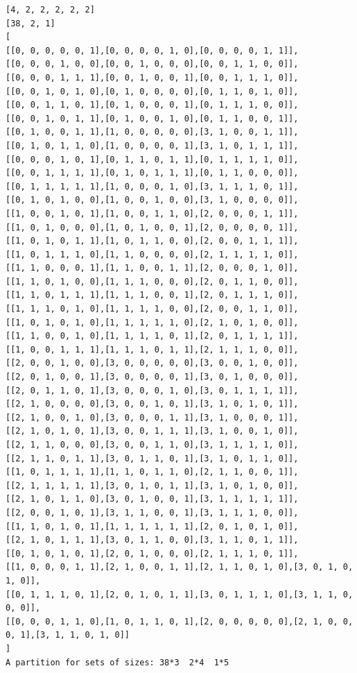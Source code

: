 \documentclass[final]{dmtcs-episciences}
\begin{document}
\begin{appendices}
\newpage

\begin{verbatim}
[4, 2, 2, 2, 2, 2]
[38, 2, 1]
[
[[0, 0, 0, 0, 0, 1],[0, 0, 0, 0, 1, 0],[0, 0, 0, 0, 1, 1]],
[[0, 0, 0, 1, 0, 0],[0, 0, 1, 0, 0, 0],[0, 0, 1, 1, 0, 0]],
[[0, 0, 0, 1, 1, 1],[0, 0, 1, 0, 0, 1],[0, 0, 1, 1, 1, 0]],
[[0, 0, 1, 0, 1, 0],[0, 1, 0, 0, 0, 0],[0, 1, 1, 0, 1, 0]],
[[0, 0, 1, 1, 0, 1],[0, 1, 0, 0, 0, 1],[0, 1, 1, 1, 0, 0]],
[[0, 0, 1, 0, 1, 1],[0, 1, 0, 0, 1, 0],[0, 1, 1, 0, 0, 1]],
[[0, 1, 0, 0, 1, 1],[1, 0, 0, 0, 0, 0],[3, 1, 0, 0, 1, 1]],
[[0, 1, 0, 1, 1, 0],[1, 0, 0, 0, 0, 1],[3, 1, 0, 1, 1, 1]],
[[0, 0, 0, 1, 0, 1],[0, 1, 1, 0, 1, 1],[0, 1, 1, 1, 1, 0]],
[[0, 0, 1, 1, 1, 1],[0, 1, 0, 1, 1, 1],[0, 1, 1, 0, 0, 0]],
[[0, 1, 1, 1, 1, 1],[1, 0, 0, 0, 1, 0],[3, 1, 1, 1, 0, 1]],
[[0, 1, 0, 1, 0, 0],[1, 0, 0, 1, 0, 0],[3, 1, 0, 0, 0, 0]],
[[1, 0, 0, 1, 0, 1],[1, 0, 0, 1, 1, 0],[2, 0, 0, 0, 1, 1]],
[[1, 0, 1, 0, 0, 0],[1, 0, 1, 0, 0, 1],[2, 0, 0, 0, 0, 1]],
[[1, 0, 1, 0, 1, 1],[1, 0, 1, 1, 0, 0],[2, 0, 0, 1, 1, 1]],
[[1, 0, 1, 1, 1, 0],[1, 1, 0, 0, 0, 0],[2, 1, 1, 1, 1, 0]],
[[1, 1, 0, 0, 0, 1],[1, 1, 0, 0, 1, 1],[2, 0, 0, 0, 1, 0]],
[[1, 1, 0, 1, 0, 0],[1, 1, 1, 0, 0, 0],[2, 0, 1, 1, 0, 0]],
[[1, 1, 0, 1, 1, 1],[1, 1, 1, 0, 0, 1],[2, 0, 1, 1, 1, 0]],
[[1, 1, 1, 0, 1, 0],[1, 1, 1, 1, 0, 0],[2, 0, 0, 1, 1, 0]],
[[1, 0, 1, 0, 1, 0],[1, 1, 1, 1, 1, 0],[2, 1, 0, 1, 0, 0]],
[[1, 1, 0, 0, 1, 0],[1, 1, 1, 1, 0, 1],[2, 0, 1, 1, 1, 1]],
[[1, 0, 0, 1, 1, 1],[1, 1, 1, 0, 1, 1],[2, 1, 1, 1, 0, 0]],
[[2, 0, 0, 1, 0, 0],[3, 0, 0, 0, 0, 0],[3, 0, 0, 1, 0, 0]],
[[2, 0, 1, 0, 0, 1],[3, 0, 0, 0, 0, 1],[3, 0, 1, 0, 0, 0]],
[[2, 0, 1, 1, 0, 1],[3, 0, 0, 0, 1, 0],[3, 0, 1, 1, 1, 1]],
[[2, 1, 0, 0, 0, 0],[3, 0, 0, 1, 0, 1],[3, 1, 0, 1, 0, 1]],
[[2, 1, 0, 0, 1, 0],[3, 0, 0, 0, 1, 1],[3, 1, 0, 0, 0, 1]],
[[2, 1, 0, 1, 0, 1],[3, 0, 0, 1, 1, 1],[3, 1, 0, 0, 1, 0]],
[[2, 1, 1, 0, 0, 0],[3, 0, 0, 1, 1, 0],[3, 1, 1, 1, 1, 0]],
[[2, 1, 1, 0, 1, 1],[3, 0, 1, 1, 0, 1],[3, 1, 0, 1, 1, 0]],
[[1, 0, 1, 1, 1, 1],[1, 1, 0, 1, 1, 0],[2, 1, 1, 0, 0, 1]],
[[2, 1, 1, 1, 1, 1],[3, 0, 1, 0, 1, 1],[3, 1, 0, 1, 0, 0]],
[[2, 1, 0, 1, 1, 0],[3, 0, 1, 0, 0, 1],[3, 1, 1, 1, 1, 1]],
[[2, 0, 0, 1, 0, 1],[3, 1, 1, 0, 0, 1],[3, 1, 1, 1, 0, 0]],
[[1, 1, 0, 1, 0, 1],[1, 1, 1, 1, 1, 1],[2, 0, 1, 0, 1, 0]],
[[2, 1, 0, 1, 1, 1],[3, 0, 1, 1, 0, 0],[3, 1, 1, 0, 1, 1]],
[[0, 1, 0, 1, 0, 1],[2, 0, 1, 0, 0, 0],[2, 1, 1, 1, 0, 1]],
[[1, 0, 0, 0, 1, 1],[2, 1, 0, 0, 1, 1],[2, 1, 1, 0, 1, 0],[3, 0, 1, 0, 1, 0]],
[[0, 1, 1, 1, 0, 1],[2, 0, 1, 0, 1, 1],[3, 0, 1, 1, 1, 0],[3, 1, 1, 0, 0, 0]],
[[0, 0, 0, 1, 1, 0],[1, 0, 1, 1, 0, 1],[2, 0, 0, 0, 0, 0],[2, 1, 0, 0, 0, 1],[3, 1, 1, 0, 1, 0]]
]
A partition for sets of sizes: 38*3  2*4  1*5
\end{verbatim}


\end{appendices}
\end{document}
